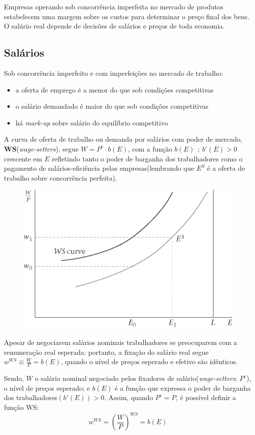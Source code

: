 \documentclass[a4paper,12pt]{article}[abntex2]
\begin{document}
Empresas operando sob concorrência imperfeita no mercado de produtos estabelecem uma margem sobre os custos para determinar o preço final dos bens. O salário real depende de decisões de salários e preços de toda economia. 

\subsection{\textbf{Salários}}
Sob concorrência imperfeito e com imperfeições no mercado de trabalho: \begin{itemize}
    \item a oferta de emprego é a menor do que sob condições competitivas
    \item o salário demandado é maior do que sob condições competitivas
    \item há \textit{mark-up} sobre salário do equilíbrio competitivo
\end{itemize}

A curva de oferta de trabalho ou demanda por salários com poder de mercado, \textbf{WS}(\textit{wage-setters}), segue \(W=P^e\cdot b(E)\), com a função \(b(E) \ \  ;\  b'(E)>0\) crescente em \(E\) refletindo tanto o poder de barganha dos trabalhadores como o pagamento de salários-eficiência pelas empresas(lembrando que \(E^S\) é a oferta de trabalho sobre concorrência perfeita).

\begin{figure}[H]
    \centering
    \includegraphics[width=0.7\linewidth]{Imagens/a5i8.png}
\end{figure}

Apesar de negociarem salários nominais trabalhadores se preocuparem com a remuneração real esperada: portanto, a fixação do salário real segue \(w^{WS}\equiv \frac{W}{P}=b(E)\), quando o nível de preços esperado e efetivo são idênticos.

Sendo, \(W\) o salário nominal negociado pelos fixadores de salário(\textit{wage-setters}; \(P^e\)), o nível de preços esperado; e \(b(E)\) é a função que expressa o poder de barganha dos trabalhadores\((b'(E))>0\). Assim, quando \(P^e=P\), é possível definir a função WS:
\[
w^{WS}=(\frac{W}{P})^{WS}=b(E)
\]
\end{document}
